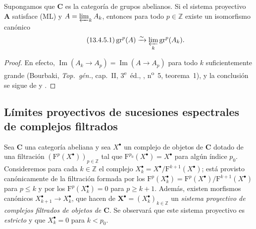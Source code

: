 \begin{corollary}[13.4.5]
\label{0.13.4.5}
\label{0.13.4.5-fr}
Supongamos que $\boldsymbol{C}$ es la categoría de grupos abelianos.
Si el sistema proyectivo $\mathbf A$ satisface \textup{(ML)} y
$A=\varprojlim_k A_k$, entonces para todo $p\in\mathbb Z$ existe un
isomorfismo canónico
\begin{equation}
\label{0.13.4.5.1-fr}
\tag{13.4.5.1}
\operatorname{gr}^p(A)\xrightarrow{\sim}
\varprojlim_k\operatorname{gr}^p(A_k).
\end{equation}
\end{corollary}

\begin{proof}
En efecto,
$\operatorname{Im}(A_k\to A_p)=\operatorname{Im}(A\to A_p)$
para todo $k$ suficientemente grande
(Bourbaki, \emph{Top.\ g\'{e}n.}, cap.~II,
3\textsuperscript{e}~\'{e}d., ,
n\textsuperscript{o}~5, teorema~1), y la conclusión se sigue de
 y .
\end{proof}

\subsection{Límites proyectivos de sucesiones espectrales de complejos filtrados}
\label{subsection:0.13.5}
\label{subsection:0.13.5-fr}

\begin{env}[13.5.1]
\label{0.13.5.1}
\label{0.13.5.1-fr}
Sea $\boldsymbol{C}$ una categoría abeliana y sea $X^\bullet$ un complejo
de objetos de $\boldsymbol{C}$ dotado de una filtración
$(\mathrm F^p(X^\bullet))_{p\in\mathbb Z}$ tal que
$\mathrm F^{p_0}(X^\bullet)=X^\bullet$ para algún índice $p_0$. Consideremos para cada $k\in\mathbb Z$ el complejo $X_k^\bullet=X^\bullet/\mathrm F^{k+1}(X^\bullet)$; está provisto canónicamente de la filtración formada por los $\mathrm F^p(X_k^\bullet)=
\mathrm F^p(X^\bullet)/\mathrm F^{k+1}(X^\bullet)$ para $p\leq k$ y por los $\mathrm F^p(X_k^\bullet)=0$ para $p\geq k+1$.
Además, existen morfismos canónicos
$X_{k+1}^\bullet\to X_k^\bullet$, que hacen de
$\mathbf X^\bullet=(X_k^\bullet)_{k\in\mathbb Z}$ un \emph{sistema proyectivo
de complejos filtrados de objetos de $\boldsymbol{C}$}.
Se observará que este sistema proyectivo es \emph{estricto} y que
$X_k^\bullet=0$ para $k<p_0$.
\end{env}

